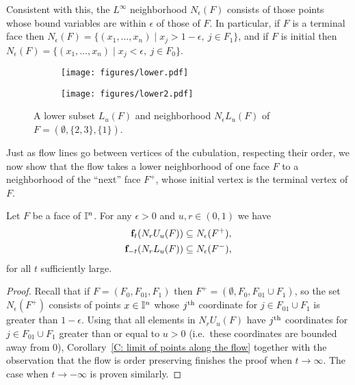 Consistent with this, the $L^\infty$ neighborhood $N_\epsilon(F)$ consists of those points whose bound variables are within $\epsilon$ of those of $F$.
In particular, if $F$ is a terminal face then $N_\epsilon(F)=\{ (x_1,\ldots, x_n)\mid x_j>1-\epsilon,\ j\in F_1\}$, and if $F$ is initial then $N_\epsilon(F)=\{ (x_1,\ldots, x_n)\mid x_j<\epsilon,\ j\in F_0\}$.

\begin{figure}[!h]
	\centering
	\begin{subfigure}{.32\textwidth}
		\texttt{[image: figures/lower.pdf]}
		\hfill
	\end{subfigure}
	\begin{subfigure}{.32\textwidth}
		\hfill
		\texttt{[image: figures/lower2.pdf]}
	\end{subfigure}
	\caption{A lower subset $L_u(F)$ and neighborhood $N_\epsilon L_u(F)$ of $F = (\emptyset, \{2,3\}, \{1\})$.}
	\label{F: lower subspace and nbhd}
\end{figure}

Just as flow lines go between vertices of the cubulation, respecting their order, we now show that the flow takes a lower neighborhood of
one face $F$ to a neighborhood of the ``next'' face $F^+$,
whose initial vertex is the terminal vertex of $F$.

\begin{lemma}\label{L: flow to initial and terminal faces}
	Let $F$ be a face of $\mathbb{I}^n$. For any $\epsilon > 0$ and $u,r \in (0, 1)$ we have
	\begin{align*}
		\mathbf{f}_{t}(N_r U_u (F)) &\subseteq N_\epsilon (F^+), \\
		\mathbf{f}_{-t}(N_r L_u (F)) &\subseteq N_\epsilon (F^-),
	\end{align*}
	for all $t$ sufficiently large.
\end{lemma}

\begin{proof}
	Recall that if $F = (F_0, F_{01}, F_1)$ then $F^+ = (\emptyset, F_0, F_{01} \cup F_1)$, so the set $N_\epsilon (F^+)$ consists of points $x \in \mathbb{I}^n$ whose $j^{\mathrm{th}}$ coordinate for $j \in F_{01} \cup F_1$ is greater than $1-\epsilon$.
	Using that all elements in $N_r U_u (F)$ have $j^{\mathrm{th}}$ coordinates for $j \in F_{01} \cup F_1$ greater than or equal to $u > 0$ (i.e.\ these coordinates are bounded away from $0$), Corollary~\ref{C: limit of points along the flow} together with the observation that the flow is order preserving finishes the proof when $t \to \infty$.
	The case when $t \to -\infty$ is proven similarly.
\end{proof}

